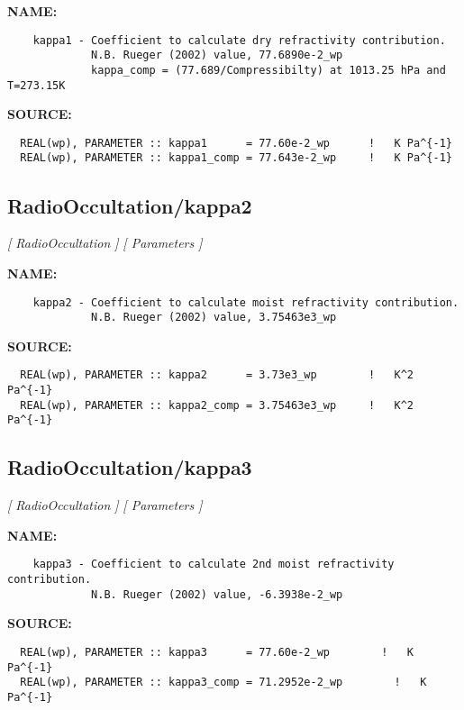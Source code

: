 \label{ch:robo73}
\label{ch:RadioOccultation_kappa1}
\textbf{NAME:}\hspace{0.08in}\begin{Verbatim}
    kappa1 - Coefficient to calculate dry refractivity contribution.
             N.B. Rueger (2002) value, 77.6890e-2_wp 
             kappa_comp = (77.689/Compressibilty) at 1013.25 hPa and T=273.15K  
\end{Verbatim}
\textbf{SOURCE:}\hspace{0.08in}\begin{Verbatim}
  REAL(wp), PARAMETER :: kappa1      = 77.60e-2_wp      !   K Pa^{-1}
  REAL(wp), PARAMETER :: kappa1_comp = 77.643e-2_wp     !   K Pa^{-1}
\end{Verbatim}
\subsection{RadioOccultation/kappa2}
\textsl{[ RadioOccultation ]}
\textsl{[ Parameters ]}

\label{ch:robo74}
\label{ch:RadioOccultation_kappa2}
\textbf{NAME:}\hspace{0.08in}\begin{Verbatim}
    kappa2 - Coefficient to calculate moist refractivity contribution.
             N.B. Rueger (2002) value, 3.75463e3_wp
\end{Verbatim}
\textbf{SOURCE:}\hspace{0.08in}\begin{Verbatim}
  REAL(wp), PARAMETER :: kappa2      = 3.73e3_wp        !   K^2 Pa^{-1}
  REAL(wp), PARAMETER :: kappa2_comp = 3.75463e3_wp     !   K^2 Pa^{-1}
\end{Verbatim}
\subsection{RadioOccultation/kappa3}
\textsl{[ RadioOccultation ]}
\textsl{[ Parameters ]}

\label{ch:robo75}
\label{ch:RadioOccultation_kappa3}
\textbf{NAME:}\hspace{0.08in}\begin{Verbatim}
    kappa3 - Coefficient to calculate 2nd moist refractivity contribution.
             N.B. Rueger (2002) value, -6.3938e-2_wp
\end{Verbatim}
\textbf{SOURCE:}\hspace{0.08in}\begin{Verbatim}
  REAL(wp), PARAMETER :: kappa3      = 77.60e-2_wp        !   K Pa^{-1}
  REAL(wp), PARAMETER :: kappa3_comp = 71.2952e-2_wp        !   K Pa^{-1}
\end{Verbatim}
